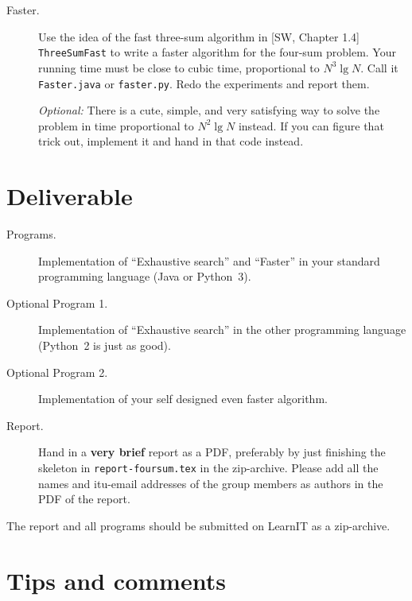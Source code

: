 \documentclass{tufte-handout}
\begin{document}
\begin{description}
\item[Faster.]
  Use the idea of the fast three-sum algorithm in [SW, Chapter 1.4] \texttt{
  ThreeSumFast} to write a faster algorithm for the four-sum problem.
  Your running time must be close to cubic time, proportional to $N^3\operatorname{lg} N$.
  Call it \texttt{Faster.java}  or \texttt{faster.py}.
  Redo the experiments and report them.

  \emph{Optional:} There is a cute, simple, and very satisfying way to solve the problem in time proportional to $N^2\operatorname{lg} N$ instead.
If you can figure that trick out, implement it and hand in that code instead.
\end{description}

\section{Deliverable}
\begin{description}
  \item[Programs.] Implementation of ``Exhaustive search'' and ``Faster'' in your standard programming language (Java or Python~3).
  \item[Optional Program 1.] Implementation of ``Exhaustive search''  in the other programming language (Python~2 is just as good).
  \item[Optional Program 2.] Implementation of your self designed even faster algorithm.
  \item[Report.]
    Hand in a \textbf{very brief} report as a PDF, preferably by just finishing the skeleton in \texttt{report-foursum.tex} in the zip-archive.
    Please add all the names and itu-email addresses of the group members as authors in the PDF of the report.
\end{description}
The report and all programs should be submitted on LearnIT as a zip-archive.

\section{Tips and comments}
\end{document}
